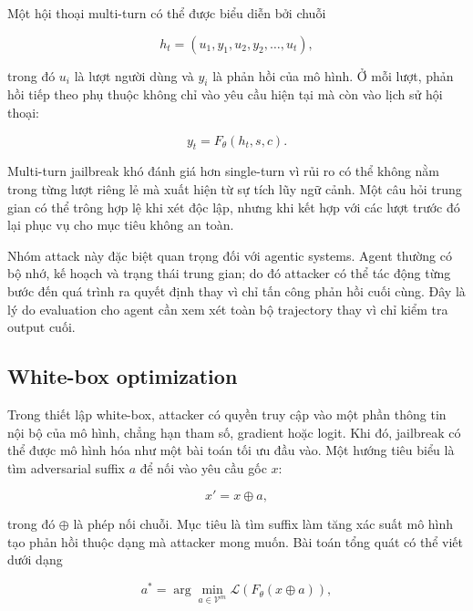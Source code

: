 Một hội thoại multi-turn có thể được biểu diễn bởi chuỗi

\begin{equation}
    h_t = (u_1, y_1, u_2, y_2, \ldots, u_t),
    \label{eq:multi-turn-history}
\end{equation}

trong đó $u_i$ là lượt người dùng và $y_i$ là phản hồi của mô hình. Ở mỗi
lượt, phản hồi tiếp theo phụ thuộc không chỉ vào yêu cầu hiện tại mà còn
vào lịch sử hội thoại:

\begin{equation}
    y_t = F_{\theta}(h_t, s, c).
    \label{eq:multi-turn-generation}
\end{equation}

Multi-turn jailbreak khó đánh giá hơn single-turn vì rủi ro có thể không
nằm trong từng lượt riêng lẻ mà xuất hiện từ sự tích lũy ngữ cảnh. Một câu
hỏi trung gian có thể trông hợp lệ khi xét độc lập, nhưng khi kết hợp với
các lượt trước đó lại phục vụ cho mục tiêu không an toàn.

Nhóm attack này đặc biệt quan trọng đối với agentic systems. Agent thường
có bộ nhớ, kế hoạch và trạng thái trung gian; do đó attacker có thể tác
động từng bước đến quá trình ra quyết định thay vì chỉ tấn công phản hồi
cuối cùng. Đây là lý do evaluation cho agent cần xem xét toàn bộ trajectory
thay vì chỉ kiểm tra output cuối.

\subsection{White-box optimization}
\label{subsec:white-box-optimization}

Trong thiết lập white-box, attacker có quyền truy cập vào một phần thông
tin nội bộ của mô hình, chẳng hạn tham số, gradient hoặc logit. Khi đó,
jailbreak có thể được mô hình hóa như một bài toán tối ưu đầu vào. Một
hướng tiêu biểu là tìm adversarial suffix $a$ để nối vào yêu cầu gốc $x$:

\begin{equation}
    x' = x \oplus a,
    \label{eq:adversarial-suffix-input}
\end{equation}

trong đó $\oplus$ là phép nối chuỗi. Mục tiêu là tìm suffix làm tăng xác
suất mô hình tạo phản hồi thuộc dạng mà attacker mong muốn. Bài toán tổng
quát có thể viết dưới dạng

\begin{equation}
    a^{*}
    =
    \arg\min_{a \in \mathcal{V}^{m}}
    \mathcal{L}
    \left(
        F_{\theta}(x \oplus a)
    \right),
    \label{eq:adversarial-suffix-optimization}
\end{equation}

